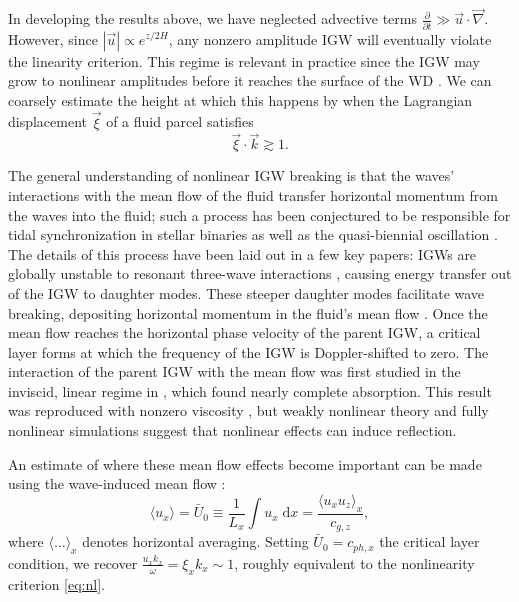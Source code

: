 \documentclass[
        fleqn,
        usenatbib,
    ]{mnras}
\newcommand*{\pd}[2]{\frac{\partial#1}{\partial#2}}
\newcommand*{\abs}[1]{\left|#1\right|}
\newcommand*{\ev}[1]{\langle#1\rangle}
\begin{document}
In developing the results above, we have neglected advective terms $\pd{}{t} \gg
\vec{u} \cdot \vec{\nabla}$. However, since $\abs{\vec{u}} \propto e^{z/2H}$,
any nonzero amplitude IGW will eventually violate the linearity criterion. This
regime is relevant in practice since the IGW may grow to nonlinear amplitudes
before it reaches the surface of the WD \citep{fullerI,fullerII}. We can coarsely
estimate the height at which this happens by when the Lagrangian displacement
$\vec{\xi}$ of a fluid parcel satisfies
\begin{equation}
    \vec{\xi} \cdot \vec{k} \gtrsim 1.\label{eq:nl}
\end{equation}

The general understanding of nonlinear IGW breaking is that the waves'
interactions with the mean flow of the fluid transfer horizontal momentum from
the waves into the fluid; such a process has been conjectured to be responsible
for tidal synchronization in stellar binaries \citep{zahn75,gn89} as well as the
quasi-biennial oscillation \citep{lindzen_qbo}. The details of this process have
been laid out in a few key papers: IGWs are globally unstable to resonant
three-wave interactions \citep{drazin}, causing energy transfer out of the IGW
to daughter modes. These steeper daughter modes facilitate wave breaking,
depositing horizontal momentum in the fluid's mean flow \citep{klostermeyer}.
Once the mean flow reaches the horizontal phase velocity of the parent IGW, a
critical layer forms at which the frequency of the IGW is Doppler-shifted to
zero. The interaction of the parent IGW with the mean flow was first studied in
the inviscid, linear regime in \citep{booker_bretherton}, which found nearly
complete absorption. This result was reproduced with nonzero viscosity
\citep{hazel}, but weakly nonlinear theory \citep{brown_stewartson} and fully
nonlinear simulations \citep{winters1994} suggest that nonlinear effects can
induce reflection.

An estimate of where these mean flow effects become important can be made using
the wave-induced mean flow \citep{eliassen_palm_cite,sutherland0}:
\begin{equation}
     \ev{u_x} = \bar{U}_0 \equiv \frac{1}{L_x}
        \int\limits u_x\;\mathrm{d}x = \frac{\ev{u_xu_z}_x}{c_{g,z}},
        \label{eq:mean_flow}
\end{equation}
where $\ev{\dots}_x$ denotes horizontal averaging. Setting $\bar{U}_0 = c_{ph,
x}$ the critical layer condition, we recover $\frac{u_xk_x}{\omega} = \xi_x k_x
\sim 1$, roughly equivalent to the nonlinearity criterion \autoref{eq:nl}.
\end{document}
